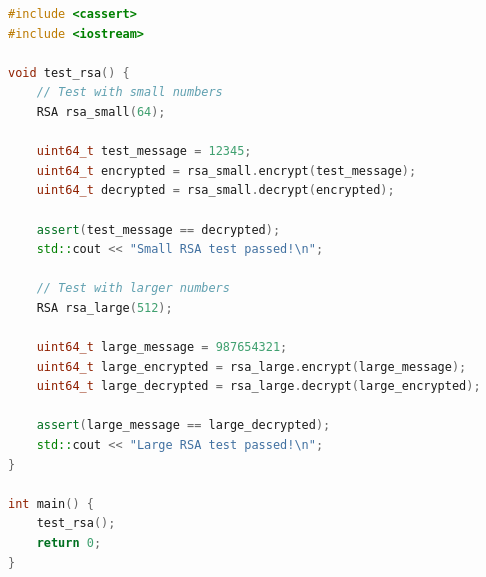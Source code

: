 \documentclass[11pt,a4paper]{article}
\begin{document}
\begin{lstlisting}[language=C++, caption=RSA Test Suite]
#include <cassert>
#include <iostream>

void test_rsa() {
    // Test with small numbers
    RSA rsa_small(64);
    
    uint64_t test_message = 12345;
    uint64_t encrypted = rsa_small.encrypt(test_message);
    uint64_t decrypted = rsa_small.decrypt(encrypted);
    
    assert(test_message == decrypted);
    std::cout << "Small RSA test passed!\n";
    
    // Test with larger numbers
    RSA rsa_large(512);
    
    uint64_t large_message = 987654321;
    uint64_t large_encrypted = rsa_large.encrypt(large_message);
    uint64_t large_decrypted = rsa_large.decrypt(large_encrypted);
    
    assert(large_message == large_decrypted);
    std::cout << "Large RSA test passed!\n";
}

int main() {
    test_rsa();
    return 0;
}
\end{lstlisting}
\end{document}
